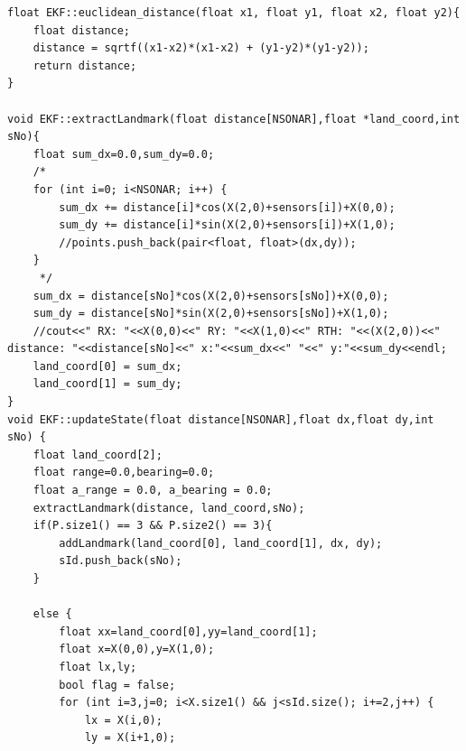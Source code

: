 \documentclass[12pt]{article}
\begin{document}
\begin{lstlisting}[caption="SLAM Source code"]
float EKF::euclidean_distance(float x1, float y1, float x2, float y2){
    float distance;
    distance = sqrtf((x1-x2)*(x1-x2) + (y1-y2)*(y1-y2));
    return distance;
}

void EKF::extractLandmark(float distance[NSONAR],float *land_coord,int sNo){
    float sum_dx=0.0,sum_dy=0.0;
    /*
    for (int i=0; i<NSONAR; i++) {
        sum_dx += distance[i]*cos(X(2,0)+sensors[i])+X(0,0);
        sum_dy += distance[i]*sin(X(2,0)+sensors[i])+X(1,0);
        //points.push_back(pair<float, float>(dx,dy));
    }
     */
    sum_dx = distance[sNo]*cos(X(2,0)+sensors[sNo])+X(0,0);
    sum_dy = distance[sNo]*sin(X(2,0)+sensors[sNo])+X(1,0);
    //cout<<" RX: "<<X(0,0)<<" RY: "<<X(1,0)<<" RTH: "<<(X(2,0))<<" distance: "<<distance[sNo]<<" x:"<<sum_dx<<" "<<" y:"<<sum_dy<<endl;
    land_coord[0] = sum_dx;
    land_coord[1] = sum_dy;
}
void EKF::updateState(float distance[NSONAR],float dx,float dy,int sNo) {
    float land_coord[2];
    float range=0.0,bearing=0.0;
    float a_range = 0.0, a_bearing = 0.0;
    extractLandmark(distance, land_coord,sNo);
    if(P.size1() == 3 && P.size2() == 3){
        addLandmark(land_coord[0], land_coord[1], dx, dy);
        sId.push_back(sNo);
    }
    
    else {
        float xx=land_coord[0],yy=land_coord[1];
        float x=X(0,0),y=X(1,0);
        float lx,ly;
        bool flag = false;
        for (int i=3,j=0; i<X.size1() && j<sId.size(); i+=2,j++) {
            lx = X(i,0);
            ly = X(i+1,0);
            

\end{lstlisting}
\end{document}
